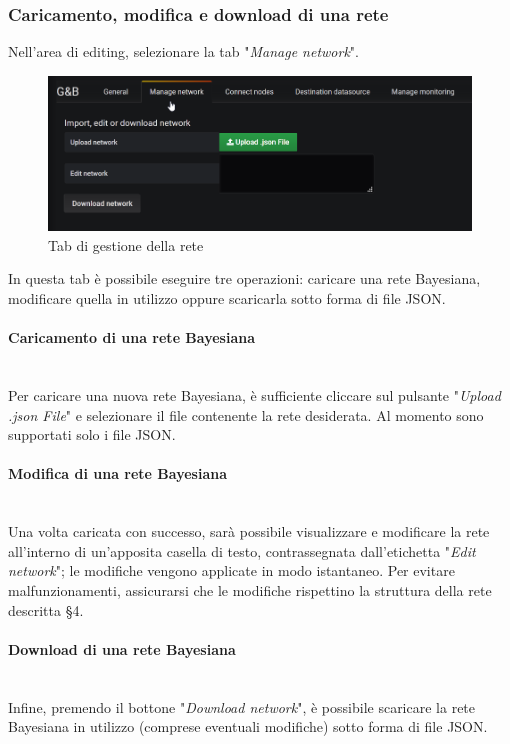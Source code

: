 \subsubsection{Caricamento, modifica e download di una rete}
Nell'area di editing, selezionare la tab "\textit{Manage network}".
\begin{figure} [H]
	\centering
	\includegraphics[scale=0.55]{Img/managenet} 
	\caption{Tab di gestione della rete} \label{} 
\end{figure} 
In questa tab è possibile eseguire tre operazioni: caricare una rete Bayesiana, modificare quella in utilizzo oppure scaricarla sotto forma di file JSON.
\paragraph{Caricamento di una rete Bayesiana}~\\
	Per caricare una nuova rete Bayesiana, è sufficiente cliccare sul pulsante "\textit{Upload .json File}" e selezionare il file contenente la rete desiderata. Al momento sono supportati solo i file JSON.
\paragraph{Modifica di una rete Bayesiana}~\\
	Una volta caricata con successo, sarà possibile visualizzare e modificare la rete all'interno di un'apposita casella di testo, contrassegnata dall'etichetta "\textit{Edit network}"; le modifiche vengono applicate in modo istantaneo. Per evitare malfunzionamenti, assicurarsi che le modifiche rispettino la struttura della rete descritta §4.
\paragraph{Download di una rete Bayesiana}~\\
	Infine, premendo il bottone "\textit{Download network}", è possibile scaricare la rete Bayesiana in utilizzo (comprese eventuali modifiche) sotto forma di file JSON.